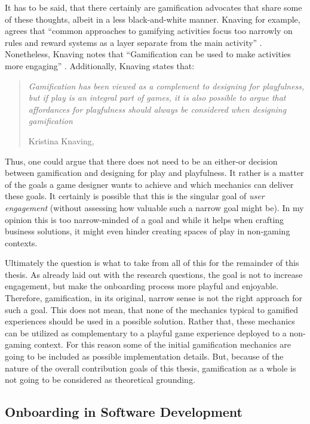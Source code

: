 It has to be said, that there certainly are gamification advocates that share some of these thoughts, albeit in a less black-and-white manner. Knaving for example, agrees that \enquote{common approaches to gamifying activities focus too narrowly on rules and reward systems as a layer separate from the main activity} \cite[p. 134]{knaving2013designing}. Nonetheless, Knaving notes that \enquote{Gamification can be used to make activities more engaging} \cite[p. 134]{knaving2013designing}. Additionally, Knaving states that:

\begin{quote}
  \textit{Gamification has been viewed as a complement to designing for playfulness, but if play is an integral part of games, it is also possible to argue that affordances for playfulness should always be considered when designing gamification}

  \footnotesize{Kristina Knaving, \cite[p. 133]{knaving2013designing}}
\end{quote}

Thus, one could argue that there does not need to be an either-or decision between gamification and designing for play and playfulness. It rather is a matter of the goals a game designer wants to achieve and which mechanics can deliver these goals. It certainly is possible that this is the singular goal of \textit{user engagement} (without assessing how valuable such a narrow goal might be). In my opinion this is too narrow-minded of a goal and while it helps when crafting business solutions, it might even hinder creating spaces of play in non-gaming contexts.

Ultimately the question is what to take from all of this for the remainder of this thesis. As already laid out with the research questions, the goal is not to increase engagement, but make the onboarding process more playful and enjoyable. Therefore, gamification, in its original, narrow sense is not the right approach for such a goal. This does not mean, that none of the mechanics typical to gamified experiences should be used in a possible solution. Rather that, these mechanics can be utilized as complementary to a playful game experience deployed to a non-gaming context. For this reason some of the initial gamification mechanics are going to be included as possible implementation details. But, because of the nature of the overall contribution goals of this thesis, gamification as a whole is not going to be considered as theoretical grounding.

\subsection{Onboarding in Software Development}

